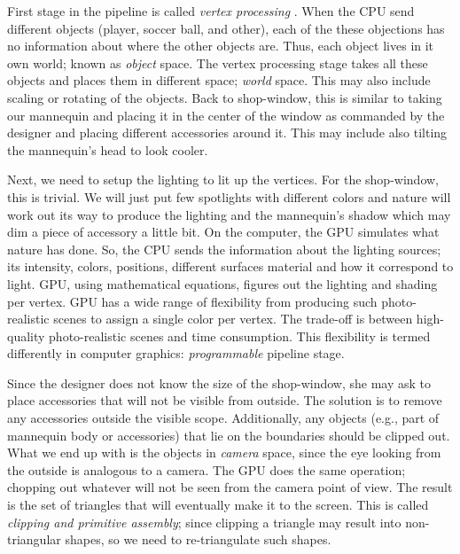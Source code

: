 \documentclass[12pt] {article}
\begin{document}
First stage in the pipeline is called \emph{vertex processing} \cite{angle2011interactive}. When the CPU send different objects (player, soccer ball, and other), each of the these objections has no information about where the other objects are. Thus, each object lives in it own world; known as \emph{object} space. The vertex processing stage takes all these objects and places them in different space; \emph{world} space. This may also include scaling or rotating of the objects. Back to shop-window, this is similar to taking our mannequin and placing it in the center of the window as commanded by the designer and placing different accessories around it. This may include also tilting the mannequin's head to look cooler. 

Next, we need to setup the lighting to lit up the vertices. For the shop-window, this is trivial. We will just put few spotlights with different colors and nature will work out its way to produce the lighting and the mannequin's shadow which may dim a piece of accessory a little bit. On the computer, the GPU simulates what nature has done. So, the CPU sends the information about the lighting sources; its intensity, colors, positions, different surfaces material and how it correspond to light. GPU, using mathematical equations, figures out the lighting and shading per vertex. GPU has a wide range of flexibility from producing such photo-realistic scenes to assign a single color per vertex. The trade-off is between high-quality photo-realistic scenes and time consumption. This flexibility is termed differently in computer graphics: \emph{programmable} pipeline stage.

Since the designer does not know the size of the shop-window, she may ask to place accessories that will not be visible from outside. The solution is to remove any accessories outside the visible scope. Additionally, any objects (e.g., part of mannequin body or accessories) that lie on the boundaries should be clipped out. What we end up with is the objects in \emph{camera} space, since the eye looking from the outside is analogous to a camera. The GPU does the same operation; chopping out whatever will not be seen from the camera point of view. The result is the set of triangles that will eventually make it to the screen. This is called \emph{clipping and primitive assembly}; since clipping a triangle may result into non-triangular shapes, so we need to re-triangulate such shapes.
\end{document}

